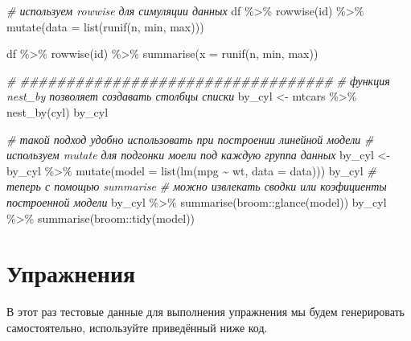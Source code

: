 \documentclass[
]{book}
\newenvironment{Shaded}{\begin{snugshade}}{\end{snugshade}}
\newcommand{\AttributeTok}[1]{\textcolor[rgb]{0.77,0.63,0.00}{#1}}
\newcommand{\CommentTok}[1]{\textcolor[rgb]{0.56,0.35,0.01}{\textit{#1}}}
\newcommand{\FunctionTok}[1]{\textcolor[rgb]{0.00,0.00,0.00}{#1}}
\newcommand{\NormalTok}[1]{#1}
\newcommand{\OtherTok}[1]{\textcolor[rgb]{0.56,0.35,0.01}{#1}}
\newcommand{\SpecialCharTok}[1]{\textcolor[rgb]{0.00,0.00,0.00}{#1}}
\begin{document}
\begin{Shaded}
\begin{Highlighting}[]
\CommentTok{\# используем rowwise для симуляции данных}
\NormalTok{df }\SpecialCharTok{\%\textgreater{}\%}
  \FunctionTok{rowwise}\NormalTok{(id) }\SpecialCharTok{\%\textgreater{}\%}
  \FunctionTok{mutate}\NormalTok{(}\AttributeTok{data =} \FunctionTok{list}\NormalTok{(}\FunctionTok{runif}\NormalTok{(n, min, max)))}

\NormalTok{df }\SpecialCharTok{\%\textgreater{}\%}
  \FunctionTok{rowwise}\NormalTok{(id) }\SpecialCharTok{\%\textgreater{}\%}
  \FunctionTok{summarise}\NormalTok{(}\AttributeTok{x =} \FunctionTok{runif}\NormalTok{(n, min, max))}

\CommentTok{\# \#\#\#\#\#\#\#\#\#\#\#\#\#\#\#\#\#\#\#\#\#\#\#\#\#\#\#\#\#\#\#\#\#\#}
\CommentTok{\# функция nest\_by позволяет создавать столбцы списки}
\NormalTok{by\_cyl }\OtherTok{\textless{}{-}}\NormalTok{ mtcars }\SpecialCharTok{\%\textgreater{}\%} \FunctionTok{nest\_by}\NormalTok{(cyl)}
\NormalTok{by\_cyl}

\CommentTok{\# такой подход удобно использовать при построении линейной модели}
\CommentTok{\# используем mutate для подгонки моели под каждую группа данных}
\NormalTok{by\_cyl }\OtherTok{\textless{}{-}}\NormalTok{ by\_cyl }\SpecialCharTok{\%\textgreater{}\%} \FunctionTok{mutate}\NormalTok{(}\AttributeTok{model =} \FunctionTok{list}\NormalTok{(}\FunctionTok{lm}\NormalTok{(mpg }\SpecialCharTok{\textasciitilde{}}\NormalTok{ wt, }\AttributeTok{data =}\NormalTok{ data)))}
\NormalTok{by\_cyl}
\CommentTok{\# теперь с помощью summarise }
\CommentTok{\# можно извлекать сводки или коэфициенты построенной модели}
\NormalTok{by\_cyl }\SpecialCharTok{\%\textgreater{}\%} \FunctionTok{summarise}\NormalTok{(broom}\SpecialCharTok{::}\FunctionTok{glance}\NormalTok{(model))}
\NormalTok{by\_cyl }\SpecialCharTok{\%\textgreater{}\%} \FunctionTok{summarise}\NormalTok{(broom}\SpecialCharTok{::}\FunctionTok{tidy}\NormalTok{(model))}
\end{Highlighting}
\end{Shaded}

\hypertarget{ux443ux43fux440ux430ux436ux43dux435ux43dux438ux44f-1}{%
\section{Упражнения}\label{ux443ux43fux440ux430ux436ux43dux435ux43dux438ux44f-1}}

В этот раз тестовые данные для выполнения упражнения мы будем генерировать самостоятельно, используйте приведённый ниже код.
\end{document}
